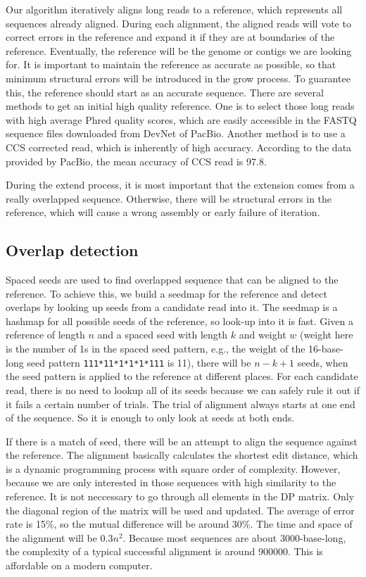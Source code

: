 \documentclass{article}
\begin{document}
Our algorithm iteratively aligns long reads to a reference, which represents all
sequences already aligned. During each alignment, the aligned reads will vote to
correct errors in the reference and expand it if they are at boundaries of the
reference. Eventually, the reference will be the genome or contigs we are
looking for. It is important to maintain the reference as accurate as possible,
        so that minimum structural errors will be introduced in the grow
        process. To guarantee this, the reference should start as an accurate
        sequence. There are several methods to get an initial high quality
        reference. One is to select those long reads with high average Phred
        quality scores, which are easily accessible in the FASTQ sequence files
        downloaded from DevNet of PacBio. Another method is to use a CCS
        corrected read, which is inherently of high accuracy. According to the
        data provided by PacBio, the mean accuracy of CCS read is 97.8.

During the extend process, it is most important that the extension comes
from a really overlapped sequence. Otherwise, there will be structural
errors in the reference, which will cause a wrong assembly or early
failure of iteration.

\subsection{Overlap detection}

Spaced seeds are used to find overlapped sequence that can be aligned to
the reference. To achieve this, we build a seedmap for the reference and
detect overlaps by looking up seeds from a candidate read into it. The
seedmap is a hashmap for all possible seeds of the reference, so look-up
into it is fast. Given a reference of length $n$ and a spaced seed with
length $k$ and weight $w$ (weight here is the number of 1s in the spaced
seed pattern, e.g., the weight of the 16-base-long seed pattern
\verb!111*11*1*1*1*111! is 11), there will be $n-k+1$ seeds, when the
seed pattern is applied to the reference at different places. For each
candidate read, there is no need to lookup all of its seeds because we
can safely rule it out if it fails a certain number of trials. The trial
of alignment always starts at one end of the sequence. So it is enough
to only look at seeds at both ends.

If there is a match of seed, there will be an attempt to align the sequence
against the reference. The alignment basically calculates the shortest edit
distance, which is a dynamic programming process with square order of
complexity. However, because we are only interested in those sequences with high
similarity to the reference. It is not neccessary to go through all elements in
the DP matrix.  Only the diagonal region of the matrix will be used and updated.
The average of error rate is 15\%, so the mutual difference will be around 30\%.
The time and space of the alignment will be $0.3n^2$. Because most sequences are
about 3000-base-long, the complexity of a typical successful alignment is around
900000. This is affordable on a modern computer.
\end{document}
